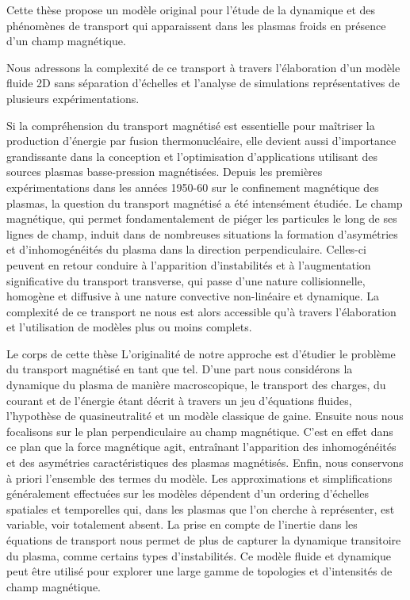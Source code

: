 
\begin{refsection}

Cette thèse propose un modèle original pour l'étude de la dynamique et des
		phénomènes de transport qui apparaissent dans les plasmas froids en présence
		d'un champ magnétique. 
		
		Nous adressons la complexité de ce transport à travers l’élaboration d'un
		modèle fluide 2D sans séparation d'échelles et l'analyse de simulations
		représentatives de plusieurs expérimentations.
			
		Si la compréhension du transport magnétisé est essentielle pour maîtriser la
		production d'énergie par fusion thermonucléaire, elle devient aussi d'importance
		grandissante dans la conception et l'optimisation d'applications utilisant des
		sources plasmas basse-pression magnétisées.
		Depuis les premières expérimentations dans les années 1950-60 sur le
		confinement magnétique des plasmas, la question du transport magnétisé a été intensément
		étudiée. Le champ magnétique, qui permet fondamentalement de piéger les
		particules le long de ses lignes de champ, induit dans de nombreuses situations la formation
		d'asymétries et d'inhomogénéités du plasma dans la direction perpendiculaire.
		Celles-ci peuvent en retour conduire à l'apparition d'instabilités et à
		l'augmentation significative du transport transverse, qui passe d'une nature
		collisionnelle, homogène et diffusive à une nature convective non-linéaire et
		dynamique. La complexité de ce transport ne nous est alors accessible qu'à
		travers l'élaboration et l'utilisation de modèles plus ou moins complets.
				
		Le corps de cette thèse L'originalité de notre approche est
		d'étudier le problème du transport magnétisé en tant que tel.
		D'une part nous considérons la dynamique du plasma de manière macroscopique, le
		transport des charges, du courant et de l'énergie étant décrit à travers un jeu
		d'équations fluides, l'hypothèse de quasineutralité et un modèle classique de
		gaine.
		Ensuite nous nous focalisons sur le plan perpendiculaire au champ magnétique.
		C'est en effet dans ce plan que la force magnétique agit, entraînant
		l'apparition des inhomogénéités et des asymétries caractéristiques des plasmas
		magnétisés.
		Enfin, nous conservons à priori l'ensemble des termes du modèle.
		Les approximations et simplifications généralement effectuées sur les
		modèles dépendent d'un ordering d'échelles spatiales et temporelles qui, dans
		les plasmas que l'on cherche à représenter, est variable, voir totalement
		absent.
		La prise en compte de l'inertie dans les équations de transport nous permet de
		plus de capturer la dynamique transitoire du plasma, comme certains types
		d'instabilités. Ce modèle fluide et dynamique peut être utilisé pour explorer
		une large gamme de topologies et d'intensités de champ magnétique.
				

\end{refsection}
